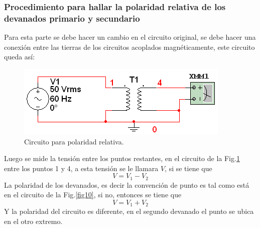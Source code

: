 \documentclass[twocolumn]{IEEEtran}
\begin{document}
\subsubsection{Procedimiento para hallar la polaridad relativa de los devanados primario y secundario}
\noindent
Para esta parte se debe hacer un cambio en el circuito original, se debe hacer una conexión entre las tierras de los circuitos acoplados magnéticamente, este circuito queda así:
\begin{figure}[H]
	\centering
		\includegraphics[scale=0.6]{circ3.PNG}
	\caption{Circuito para polaridad relativa.}
	\label{fig12}
\end{figure}
\noindent
Luego se mide la tensión entre los puntos restantes, en el circuito de la Fig.\ref{fig12} entre los puntos 1 y 4, a esta tensión se le llamara $V$, si se tiene que
\begin{equation}
 V=V_1-V_2
\label{ecu53}
\end{equation}
La polaridad de los devanados, es decir la convención de punto es tal como está en el circuito de la Fig.\ref{fig10}, si no, entonces se tiene que
\begin{equation}
 V=V_1+V_2
\label{ecu54}
\end{equation}
\noindent
Y la polaridad del circuito es diferente, en el segundo devanado el punto se ubica en el otro extremo.
\end{document}
